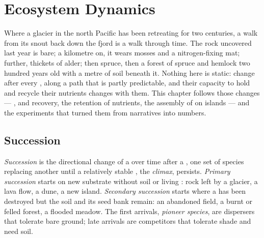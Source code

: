 \chapter{Ecosystem Dynamics}\label{ch:b1:ecosystem-dynamics}

Where a glacier in the north Pacific has been retreating for two
centuries, a walk from its snout back down the fjord is a walk
through time. The rock uncovered last year is bare; a kilometre on,
it wears mosses and a nitrogen-fixing mat; further, thickets of
alder; then spruce, then a forest of spruce and hemlock two hundred
years old with a metre of soil beneath it. Nothing here is static:
 change after every , along a path that is
partly predictable, and their capacity to hold and recycle their
nutrients changes with them. This chapter follows those changes ---
,  and recovery, the retention of nutrients,
the assembly of  on islands --- and the experiments that
turned them from narratives into numbers.

\section{Succession}

\begin{definition}\label{def:b1:ecosystem-dynamics:succession}
\emph{Succession} is the directional change of a  over time
after a , one set of species replacing another until a
relatively stable , the \emph{climax}, persists. \emph{Primary
succession} starts on new substrate without soil or living
: rock left by a glacier, a lava flow, a dune, a new island.
\emph{Secondary succession} starts where a  has been
destroyed but the soil and its seed bank remain: an abandoned field,
a burnt or felled forest, a flooded meadow. The first arrivals,
\emph{pioneer species}, are dispersers that tolerate bare ground;
late arrivals are competitors that tolerate shade and need soil.
\end{definition}

